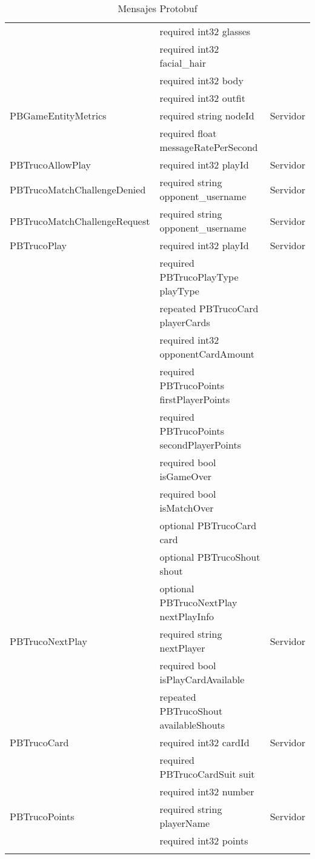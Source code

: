 \begin{longtable}{|l|l|l|}
                            & required int32 glasses & \\
                            & required int32 facial\_hair & \\
                            & required int32 body & \\
                            & required int32 outfit & \\
    \hline
    PBGameEntityMetrics & required string nodeId & Servidor \\
                        & required float messageRatePerSecond & \\
    \hline
    PBTrucoAllowPlay & required int32 playId & Servidor \\
    \hline
    PBTrucoMatchChallengeDenied & required string opponent\_username & Servidor \\
    \hline
    PBTrucoMatchChallengeRequest & required string opponent\_username & Servidor \\
    \hline
    PBTrucoPlay & required int32 playId & Servidor \\
                & required PBTrucoPlayType playType & \\
                & repeated PBTrucoCard playerCards & \\
                & required int32 opponentCardAmount & \\
                & required PBTrucoPoints firstPlayerPoints & \\
                & required PBTrucoPoints secondPlayerPoints & \\
                & required bool isGameOver & \\
                & required bool isMatchOver & \\
                & optional PBTrucoCard card & \\
                & optional PBTrucoShout shout & \\
                & optional PBTrucoNextPlay nextPlayInfo & \\
    \hline
    PBTrucoNextPlay & required string nextPlayer & Servidor \\
                    & required bool isPlayCardAvailable & \\
                    & repeated PBTrucoShout availableShouts & \\
    \hline
    PBTrucoCard & required int32 cardId & Servidor \\
                & required PBTrucoCardSuit suit & \\
                & required int32 number & \\
    \hline
    PBTrucoPoints & required string playerName & Servidor \\
                    & required int32 points & \\
    \hline

    \caption{Mensajes Protobuf}\\    
\end{longtable}

